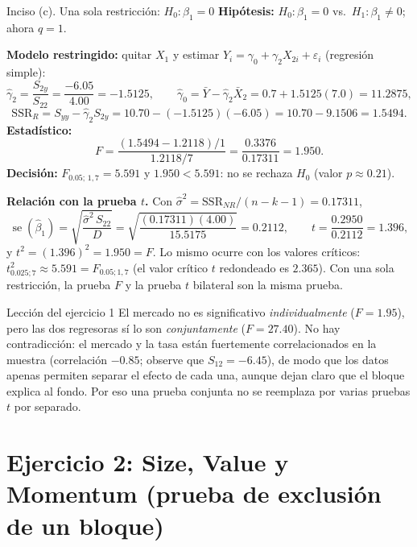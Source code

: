 \documentclass[11pt,letterpaper]{article}
\newcommand{\SSR}{\mathrm{SSR}}
\begin{document}
\begin{paso}{Inciso (c). Una sola restricción: $H_0:\beta_1=0$}
\textbf{Hipótesis:} $H_0:\beta_1=0$ vs.\ $H_1:\beta_1\neq0$; ahora $q=1$.

\textbf{Modelo restringido:} quitar $X_1$ y estimar $Y_i=\gamma_0+\gamma_2X_{2i}+\varepsilon_i$
(regresión simple):
\[
\hat\gamma_2=\frac{S_{2y}}{S_{22}}=\frac{-6.05}{4.00}=-1.5125,\qquad
\hat\gamma_0=\bar Y-\hat\gamma_2\bar X_2=0.7+1.5125(7.0)=11.2875,
\]
\[
\SSR_R=S_{yy}-\hat\gamma_2S_{2y}=10.70-(-1.5125)(-6.05)=10.70-9.1506=1.5494 .
\]
\textbf{Estadístico:}
\[
F=\frac{(1.5494-1.2118)/1}{1.2118/7}=\frac{0.3376}{0.17311}=1.950 .
\]
\textbf{Decisión:} $F_{0.05;\,1,7}=5.591$ y $1.950<5.591$: no se rechaza $H_0$ (valor $p\approx0.21$).

\textbf{Relación con la prueba $t$.} Con $\hat\sigma^2=\SSR_{NR}/(n-k-1)=0.17311$,
\[
\operatorname{se}(\hat\beta_1)=\sqrt{\frac{\hat\sigma^2\,S_{22}}{D}}
=\sqrt{\frac{(0.17311)(4.00)}{15.5175}}=0.2112,\qquad
t=\frac{0.2950}{0.2112}=1.396,
\]
y $t^2=(1.396)^2=1.950=F$. Lo mismo ocurre con los valores críticos:
$t_{0.025;7}^2\approx5.591=F_{0.05;1,7}$ (el valor crítico $t$ redondeado es $2.365$). Con una sola restricción, la prueba $F$ y la prueba $t$
bilateral son la misma prueba.
\end{paso}

\begin{nota}{Lección del ejercicio 1}
El mercado no es significativo \emph{individualmente} ($F=1.95$), pero las dos regresoras sí lo son
\emph{conjuntamente} ($F=27.40$). No hay contradicción: el mercado y la tasa están fuertemente
correlacionados en la muestra (correlación $-0.85$; observe que $S_{12}=-6.45$), de modo que los datos
apenas permiten separar el efecto de cada una, aunque dejan claro que el bloque explica al fondo. Por
eso una prueba conjunta no se reemplaza por varias pruebas $t$ por separado.
\end{nota}

\section{Ejercicio 2: Size, Value y Momentum (prueba de exclusión de un bloque)}
\end{document}
